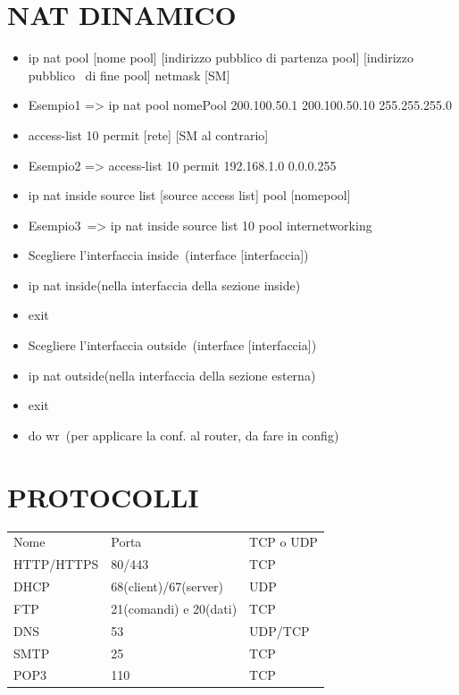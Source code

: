 \documentclass[
]{article}
\providecommand{\tightlist}{%
  \setlength{\itemsep}{0pt}\setlength{\parskip}{0pt}}
\begin{document}
\section{\texorpdfstring{{NAT
DINAMICO}}{NAT DINAMICO}}\label{h.vmvgdbeh4ub}

\begin{itemize}
\tightlist
\item
  {ip nat pool {[}nome pool{]} {[}indirizzo pubblico di partenza pool{]}
  {[}indirizzo pubblico ~di fine pool{]} netmask {[}SM{]}}
\item
  {Esempio1 =\textgreater{} }{ip nat pool nomePool 200.100.50.1
  200.100.50.10 255.255.255.0}
\item
  {access-list 10 permit {[}rete{]} {[}SM al contrario{]}}
\item
  {Esempio2 =\textgreater{} }{access-list 10 permit 192.168.1.0
  0.0.0.255}
\item
  {ip nat inside source list {[}source access list{]} pool
  {[}nomepool{]}}
\item
  {Esempio3}{~=\textgreater{} }{ip nat inside source list 10 pool
  internetworking}
\item
  {Scegliere l'interfaccia inside}{~(interface {[}interfaccia{]})}
\item
  {ip nat inside}{(nella interfaccia della sezione inside)}
\item
  {exit}
\item
  {Scegliere l'interfaccia outside}{~(interface {[}interfaccia{]})}
\item
  {ip nat outside}{(nella interfaccia della sezione esterna)}
\item
  {exit}
\item
  {do wr}{~(per applicare la conf. al router, da fare in config)}
\end{itemize}

{}

\section{\texorpdfstring{{PROTOCOLLI}}{PROTOCOLLI}}\label{h.dllozhjy529h}

\begin{longtable}[]{@{}lll@{}}
\toprule\noalign{}
\endhead
\bottomrule\noalign{}
\endlastfoot
{Nome} & {Porta} & {TCP o UDP} \\
{HTTP/HTTPS} & {80/443} & {TCP} \\
{DHCP} & {68(client)/67(server)} & {UDP} \\
{FTP} & {21(comandi) e 20(dati)} & {TCP} \\
{DNS} & {53} & {UDP/TCP} \\
{SMTP} & {25} & {TCP} \\
{POP3} & {110} & {TCP} \\
\end{longtable}
\end{document}
